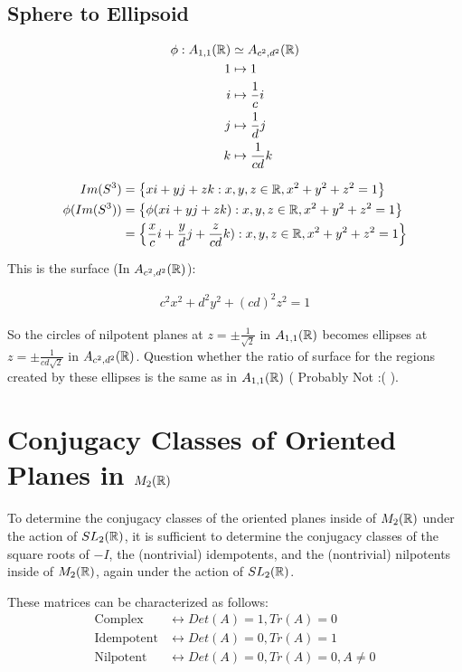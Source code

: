 \documentclass{article}
\begin{document}
\subsection{Sphere to Ellipsoid}
\begin{align*}
    \phi: A_{1,1}(\protect\mathbb{R}) &\simeq A_{c^2,d^2}(\protect\mathbb{R}) \\
    1 &\mapsto 1 \\
    i &\mapsto \frac{1}{c}i \\
    j &\mapsto \frac{1}{d}j \\
    k &\mapsto \frac{1}{cd}k
\end{align*}

\begin{align*}
    Im(S^3)       &= \left\{xi + yj + zk : x,y,z \in \protect\mathbb{R}, x^2 + y^2 + z^2 = 1\right\} \\
    \phi(Im(S^3)) &=  \left\{\phi(xi + yj + zk) : x,y,z \in \protect\mathbb{R}, x^2 + y^2 + z^2 = 1\right\} \\
                  &= \left\{\frac{x}{c}i + \frac{y}{d}j + \frac{z}{cd}k) : x,y,z \in \protect\mathbb{R}, x^2 + y^2 + z^2 = 1\right\} \\
\end{align*}

This is the surface (In $A_{c^2,d^2}(\protect\mathbb{R})$):

\begin{gather*}
    c^2x^2+d^2y^2+(cd)^2z^2 = 1 
\end{gather*}

So the circles of nilpotent planes at $z = \pm \frac{1}{\sqrt{2}}$ in $A_{1,1}(\protect\mathbb{R})$ becomes ellipses at $z = \pm \frac{1}{cd\sqrt{2}}$ in $A_{c^2, d^2}(\protect\mathbb{R})$. Question whether the ratio of surface for the regions created by these ellipses is the same as in $A_{1,1}(\protect\mathbb{R})$ ( Probably Not :( ). 

\section{Conjugacy Classes of Oriented Planes in $M_2(\protect\mathbb{R})$}

To determine the conjugacy classes of the oriented planes inside of $M_2(\protect\mathbb{R})$ under the action of $SL_2(\protect\mathbb{R})$, it is sufficient to determine  the conjugacy classes of the square roots of $-I$, the (nontrivial) idempotents, and the (nontrivial) nilpotents inside of $M_2(\protect\mathbb{R})$, again under the action of $SL_2(\protect\mathbb{R})$.

These matrices can be characterized as follows:
\begin{align*}
    \text{Complex} &\longleftrightarrow Det(A)=1,Tr(A)=0\\
    \text{Idempotent} &\longleftrightarrow Det(A)=0,Tr(A)=1\\
    \text{Nilpotent} &\longleftrightarrow Det(A)=0,Tr(A)=0,A\neq0\\
\end{align*}
\end{document}
